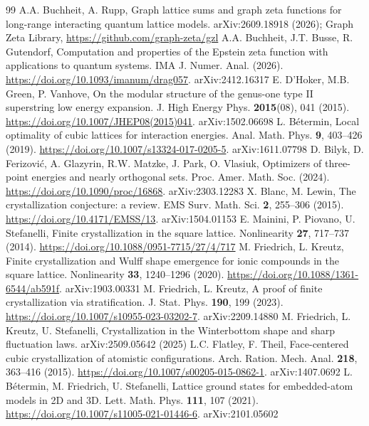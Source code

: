 \documentclass[10pt,twocolumn,a4paper]{article}
\theoremstyle{definition}
\begin{document}
\begin{thebibliography}{99}
 A.A. Buchheit, A. Rupp, Graph lattice sums and graph zeta functions for long-range interacting quantum lattice models. arXiv:2609.18918 (2026); Graph Zeta Library, \url{https://github.com/graph-zeta/gzl}
 A.A. Buchheit, J.T. Busse, R. Gutendorf, Computation and properties of the Epstein zeta function with applications to quantum systems. IMA J. Numer. Anal. (2026). \url{https://doi.org/10.1093/imanum/drag057}. arXiv:2412.16317
 E. D'Hoker, M.B. Green, P. Vanhove, On the modular structure of the genus-one type II superstring low energy expansion. J. High Energy Phys. \textbf{2015}(08), 041 (2015). \url{https://doi.org/10.1007/JHEP08(2015)041}. arXiv:1502.06698
 L. B\'etermin, Local optimality of cubic lattices for interaction energies. Anal. Math. Phys. \textbf{9}, 403--426 (2019). \url{https://doi.org/10.1007/s13324-017-0205-5}. arXiv:1611.07798
 D. Bilyk, D. Ferizovi\'c, A. Glazyrin, R.W. Matzke, J. Park, O. Vlasiuk, Optimizers of three-point energies and nearly orthogonal sets. Proc. Amer. Math. Soc. (2024). \url{https://doi.org/10.1090/proc/16868}. arXiv:2303.12283
 X. Blanc, M. Lewin, The crystallization conjecture: a review. EMS Surv. Math. Sci. \textbf{2}, 255--306 (2015). \url{https://doi.org/10.4171/EMSS/13}. arXiv:1504.01153
 E. Mainini, P. Piovano, U. Stefanelli, Finite crystallization in the square lattice. Nonlinearity \textbf{27}, 717--737 (2014). \url{https://doi.org/10.1088/0951-7715/27/4/717}
 M. Friedrich, L. Kreutz, Finite crystallization and Wulff shape emergence for ionic compounds in the square lattice. Nonlinearity \textbf{33}, 1240--1296 (2020). \url{https://doi.org/10.1088/1361-6544/ab591f}. arXiv:1903.00331
 M. Friedrich, L. Kreutz, A proof of finite crystallization via stratification. J. Stat. Phys. \textbf{190}, 199 (2023). \url{https://doi.org/10.1007/s10955-023-03202-7}. arXiv:2209.14880
 M. Friedrich, L. Kreutz, U. Stefanelli, Crystallization in the Winterbottom shape and sharp fluctuation laws. arXiv:2509.05642 (2025)
 L.C. Flatley, F. Theil, Face-centered cubic crystallization of atomistic configurations. Arch. Ration. Mech. Anal. \textbf{218}, 363--416 (2015). \url{https://doi.org/10.1007/s00205-015-0862-1}. arXiv:1407.0692
 L. B\'etermin, M. Friedrich, U. Stefanelli, Lattice ground states for embedded-atom models in 2D and 3D. Lett. Math. Phys. \textbf{111}, 107 (2021). \url{https://doi.org/10.1007/s11005-021-01446-6}. arXiv:2101.05602

\end{thebibliography}
\end{document}
